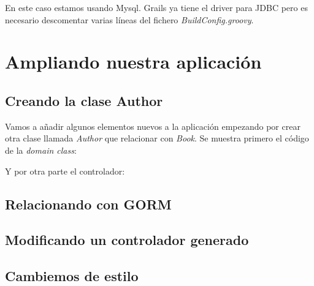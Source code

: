 \documentclass[a4paper,12pt,spanish]{article}
\begin{document}


En este caso estamos usando Mysql. Grails ya tiene el driver para JDBC pero es necesario descomentar varias líneas del fichero {\it BuildConfig.groovy}.



\section{Ampliando nuestra aplicación}
\subsection{Creando la clase Author}

Vamos a añadir algunos elementos nuevos a la aplicación empezando por crear otra clase llamada {\it Author} que relacionar con {\it Book}. Se muestra primero el código de la {\it domain class}:



Y por otra parte el controlador:



\subsection{Relacionando con GORM}





\subsection{Modificando un controlador generado}
\subsection{Cambiemos de estilo}
\end{document}
